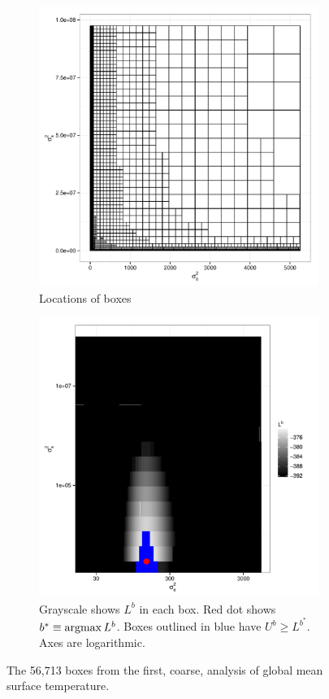 \documentclass{report}
\newcommand{\argmax}{\operatornamewithlimits{argmax}}
\begin{document}
\begin{figure}
  \begin{subfigure}{.5\textwidth}
    \centering
    \includegraphics[width=.8\linewidth]{figs/gmst-boxes1.pdf}
    \caption{Locations of boxes}
    \label{fig:gmst-boxes1}
  \end{subfigure}
  \begin{subfigure}{.5\textwidth}
    \centering
    \includegraphics[width=.8\linewidth]{figs/gmst-rll1.pdf}
    \caption{Grayscale shows $L^b$ in each box.
                  Red dot shows $b^* \equiv\argmax L^b$.
	          Boxes outlined in blue have $U^b \ge L^{b^*}$.
	          Axes are logarithmic.}
    \label{fig:gmstrll1}
  \end{subfigure}
  \caption{The 56,713 boxes from the first, coarse, analysis of global
                mean surface temperature.}
\label{fig:gmst1}
\end{figure}
\end{document}
